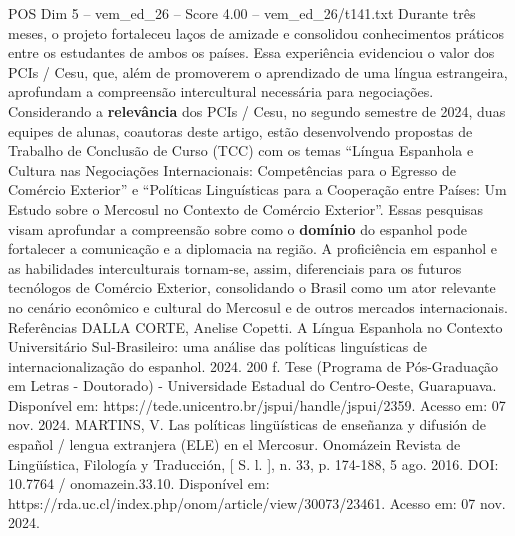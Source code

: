 \begin{textsample}{POS Dim 5 – vem\_ed\_26 – Score 4.00 – vem\_ed\_26/t141.txt}
Durante três meses, o projeto fortaleceu laços de amizade e consolidou conhecimentos práticos entre os estudantes de ambos os países.
Essa experiência evidenciou o valor dos PCIs / Cesu, que, além de promoverem o aprendizado de uma língua estrangeira, aprofundam a compreensão intercultural necessária para negociações.
Considerando a \textbf{relevância} dos PCIs / Cesu, no segundo semestre de 2024, duas equipes de alunas, coautoras deste artigo, estão desenvolvendo propostas de Trabalho de Conclusão de Curso (TCC) com os temas “Língua Espanhola e Cultura nas Negociações Internacionais: Competências para o Egresso de Comércio Exterior” e “Políticas Linguísticas para a Cooperação entre Países: Um Estudo sobre o Mercosul no Contexto de Comércio Exterior”.
Essas pesquisas visam aprofundar a compreensão sobre como o \textbf{domínio} do espanhol pode fortalecer a comunicação e a diplomacia na região.
A proficiência em espanhol e as habilidades interculturais tornam-se, assim, diferenciais para os futuros tecnólogos de Comércio Exterior, consolidando o Brasil como um ator relevante no cenário econômico e cultural do Mercosul e de outros mercados internacionais.
Referências DALLA CORTE, Anelise Copetti.
A Língua Espanhola no Contexto Universitário Sul-Brasileiro: uma análise das políticas linguísticas de internacionalização do espanhol. 2024. 200 f.
Tese (Programa de Pós-Graduação em Letras - Doutorado) - Universidade Estadual do Centro-Oeste, Guarapuava.
Disponível em: https://tede.unicentro.br/jspui/handle/jspui/2359.
Acesso em: 07 nov. 2024.
MARTINS, V.
Las políticas lingüísticas de enseñanza y difusión de español / lengua extranjera (ELE) en el Mercosur.
Onomázein Revista de Lingüística, Filología y Traducción, [ S. l. ], n. 33, p. 174-188, 5 ago. 2016.
DOI: 10.7764 / onomazein.33.10.
Disponível em: https://rda.uc.cl/index.php/onom/article/view/30073/23461.
Acesso em: 07 nov. 2024.

\end{textsample}
